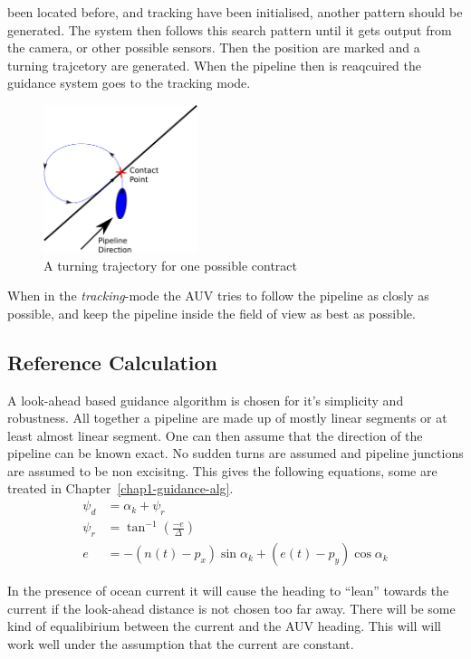 	been located before, and tracking have been initialised, another pattern should be generated. The
	system then follows this search pattern until it gets output from the camera, or other possible
	sensors. Then the position are marked and a turning trajcetory are generated. When the pipeline then
	is reaqcuired the guidance system goes to the tracking mode.
	\begin{figure}[htbp]
		\centering
		\includegraphics[width=0.4\textwidth]{pics/contact_trajectory}
		\caption{A turning trajectory for one possible contract}
		\label{fig:ch2-turning-trajectory}
	\end{figure}
	
	When in the \textit{tracking}-mode the AUV tries to follow the pipeline as closly as possible, and
	keep the pipeline inside the field of view as best as possible.

	\subsection{Reference Calculation}
		A look-ahead based guidance algorithm is chosen for it's simplicity and robustness. All
		together a pipeline are made up of mostly linear segments or at least almost linear
		segment. One can then assume that the direction of the pipeline can be known exact.
		No sudden turns are assumed and pipeline junctions are assumed to be non excisitng. This gives
		the following equations, some are treated in Chapter~\ref{chap1-guidance-alg}.
		\begin{align}
			\psi_d &= \alpha_k + \psi_r \\
			\psi_r &= \tan^{-1} \left( \frac{-e}{\Delta} \right)\\
			e &= -(n(t) - p_x)\sin\alpha_k + (e(t) - p_y) \cos\alpha_k
		\end{align}
		
		In the presence of ocean current it will cause the heading to ``lean'' towards the current if
		the look-ahead distance is not chosen too far away. There will be some kind of equalibirium
		between the current and the AUV heading. This will will work well under the assumption that
		the current are constant.
		

